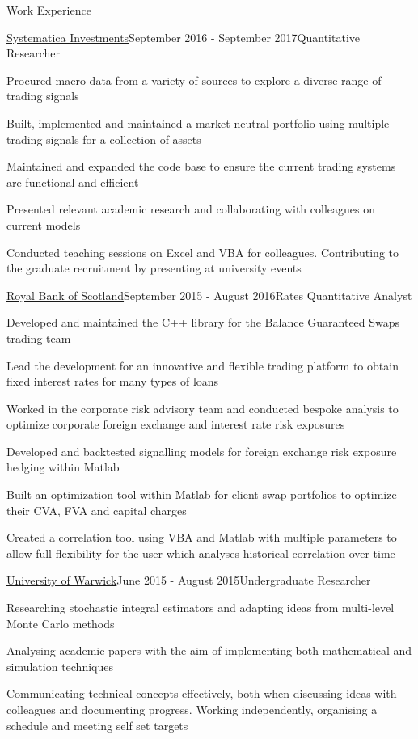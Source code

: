\documentclass{resume} %
\begin{document}
\begin{rSection}{Work Experience}
\begin{rSubsection}{\href{https://www.systematica.com/}{Systematica Investments}}{September 2016 - September 2017}{Quantitative Researcher}{}
	\item Procured macro data from a variety of sources to explore a diverse range of trading signals
	\item Built, implemented and maintained a market neutral portfolio using multiple trading signals for a collection of assets
	\item Maintained and expanded the code base to ensure the current trading systems are functional and efficient
	\item Presented relevant academic research and collaborating with colleagues on current models
	\item Conducted teaching sessions on Excel and VBA for colleagues. Contributing to the graduate recruitment by presenting at university events
\end{rSubsection}
\begin{rSubsection}{\href{https://www.natwestmarkets.com/}{Royal Bank of Scotland}}{September 2015 - August 2016}{Rates Quantitative Analyst}{}
	\item Developed and maintained the C++ library for the Balance Guaranteed Swaps trading team
	\item Lead the development for an innovative and flexible trading platform to obtain fixed interest rates for many types of loans
	\item Worked in the corporate risk advisory team and conducted bespoke analysis to optimize corporate foreign exchange and interest rate risk exposures
	\item Developed and backtested signalling models for foreign exchange risk exposure hedging within Matlab
	\item Built an optimization tool within Matlab for client swap portfolios to optimize their CVA, FVA and capital charges 
	\item Created a correlation tool using VBA and Matlab with multiple parameters to allow full flexibility for the user which analyses historical correlation over time

\end{rSubsection}

\iffalse
\begin{rSubsection}{\href{https://warwick.ac.uk/fac/sci/maths/}{University of Warwick}}{June 2015 - August 2015}{Undergraduate Researcher}{}
\item Researching stochastic integral estimators and adapting ideas from multi-level Monte Carlo methods
\item Analysing academic papers with the aim of implementing both mathematical and simulation techniques 
\item Communicating technical concepts effectively, both when discussing ideas with colleagues and documenting progress. Working independently, organising a schedule and meeting self set targets
	

\end{rSubsection}
\end{rSection}
\end{document}
